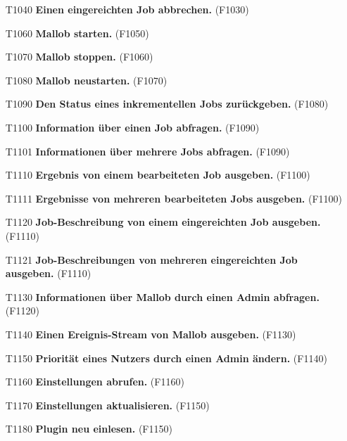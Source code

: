\begin{itemize}
    \item[T1040] \textbf{Einen eingereichten Job abbrechen.} (F1030)
    
    \item[T1060] \textbf{Mallob starten.} (F1050)
    
    \item[T1070] \textbf{Mallob stoppen.} (F1060)
    
    \item[T1080] \textbf{Mallob neustarten.} (F1070)
    
    \item[T1090] \textbf{Den Status eines inkrementellen Jobs zurückgeben.} (F1080)
    
    \item[T1100] \textbf{Information über einen Job abfragen.} (F1090)
    
    \item[T1101] \textbf{Informationen über mehrere Jobs abfragen.} (F1090)
    
    \item[T1110] \textbf{Ergebnis von einem bearbeiteten Job ausgeben.} (F1100)
    
    \item[T1111] \textbf{Ergebnisse von mehreren bearbeiteten Jobs ausgeben.} (F1100)
    
    \item[T1120] \textbf{Job-Beschreibung von einem eingereichten Job ausgeben.} (F1110)
    
    \item[T1121] \textbf{Job-Beschreibungen von mehreren eingereichten Job ausgeben.} (F1110)
    
    \item[T1130] \textbf{Informationen über Mallob durch einen Admin abfragen.} (F1120)
    
    \item[T1140] \textbf{Einen Ereignis-Stream von Mallob ausgeben.} (F1130)
    
    \item[T1150] \textbf{Priorität eines Nutzers durch einen Admin ändern.} (F1140)
    
    \item[T1160] \textbf{Einstellungen abrufen.} (F1160)
    
    \item[T1170] \textbf{Einstellungen aktualisieren.} (F1150)
    
    \item[T1180] \textbf{Plugin neu einlesen.} (F1150)
    

\end{itemize}

